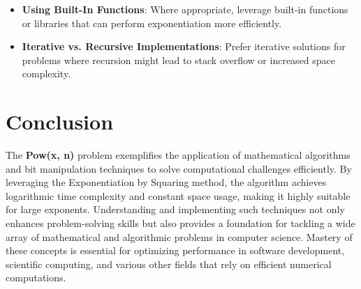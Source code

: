 \begin{itemize}
    \item \textbf{Using Built-In Functions}: Where appropriate, leverage built-in functions or libraries that can perform exponentiation more efficiently.
    
    \item \textbf{Iterative vs. Recursive Implementations}: Prefer iterative solutions for problems where recursion might lead to stack overflow or increased space complexity.
\end{itemize}

\section*{Conclusion}

The \textbf{Pow(x, n)} problem exemplifies the application of mathematical algorithms and bit manipulation techniques to solve computational challenges efficiently. By leveraging the Exponentiation by Squaring method, the algorithm achieves logarithmic time complexity and constant space usage, making it highly suitable for large exponents. Understanding and implementing such techniques not only enhances problem-solving skills but also provides a foundation for tackling a wide array of mathematical and algorithmic problems in computer science. Mastery of these concepts is essential for optimizing performance in software development, scientific computing, and various other fields that rely on efficient numerical computations.

\printindex

% 
% 
% 
% 
% 
